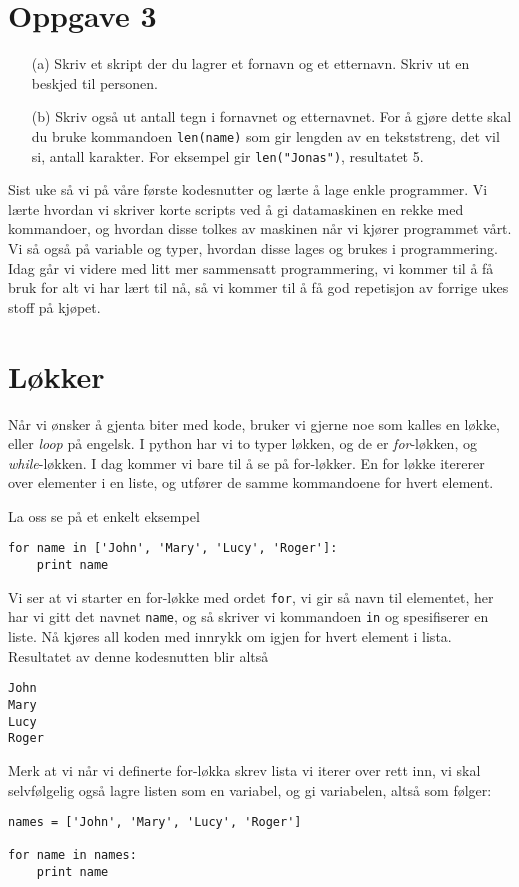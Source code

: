 \documentclass[a4paper, 11pt, notitlepage]{article}
\begin{document}
\section*{Oppgave 3}
\begin{itemize}
    \item[(a)] Skriv et skript der du lagrer et fornavn og et etternavn. Skriv ut en beskjed til personen.
    \item[(b)] Skriv også ut antall tegn i fornavnet og etternavnet. For å gjøre dette skal du bruke kommandoen \verb+len(name)+ som gir lengden av en tekststreng, det vil si, antall karakter. For eksempel gir \verb+len("Jonas")+, resultatet 5.
\end{itemize}


Sist uke så vi på våre første kodesnutter og lærte å lage enkle programmer. Vi lærte hvordan vi skriver korte scripts ved å gi datamaskinen en rekke med kommandoer, og hvordan disse tolkes av maskinen når vi kjører programmet vårt. Vi så også på variable og typer, hvordan disse lages og brukes i programmering. Idag går vi videre med litt mer sammensatt programmering, vi kommer til å få bruk for alt vi har lært til nå, så vi kommer til å få god repetisjon av forrige ukes stoff på kjøpet. 

\clearpage

\section{Løkker}
Når vi ønsker å gjenta biter med kode, bruker vi gjerne noe som kalles en løkke, eller \emph{loop} på engelsk. I python har vi to typer løkken, og de er \emph{for}-løkken, og \emph{while}-løkken. I dag kommer vi bare til å se på for-løkker. En for løkke itererer over elementer i en liste, og utfører de samme kommandoene for hvert element.

La oss se på et enkelt eksempel
\begin{lstlisting}
for name in ['John', 'Mary', 'Lucy', 'Roger']:
    print name    
\end{lstlisting}
\vspace{-0.3cm}
Vi ser at vi starter en for-løkke med ordet \verb+for+, vi gir så navn til elementet, her har vi gitt det navnet \verb+name+, og så skriver vi kommandoen \verb+in+ og spesifiserer en liste. Nå kjøres all koden med innrykk om igjen for hvert element i lista. Resultatet av denne kodesnutten blir altså
\begin{lstlisting}
John
Mary
Lucy
Roger
\end{lstlisting}
\vspace{-0.3cm}
Merk at vi når vi definerte for-løkka skrev lista vi iterer over rett inn, vi skal selvfølgelig også lagre listen som en variabel, og gi variabelen, altså som følger:
\begin{lstlisting}
names = ['John', 'Mary', 'Lucy', 'Roger']

for name in names:
    print name    
\end{lstlisting}
\vspace{-0.3cm}
\end{document}
